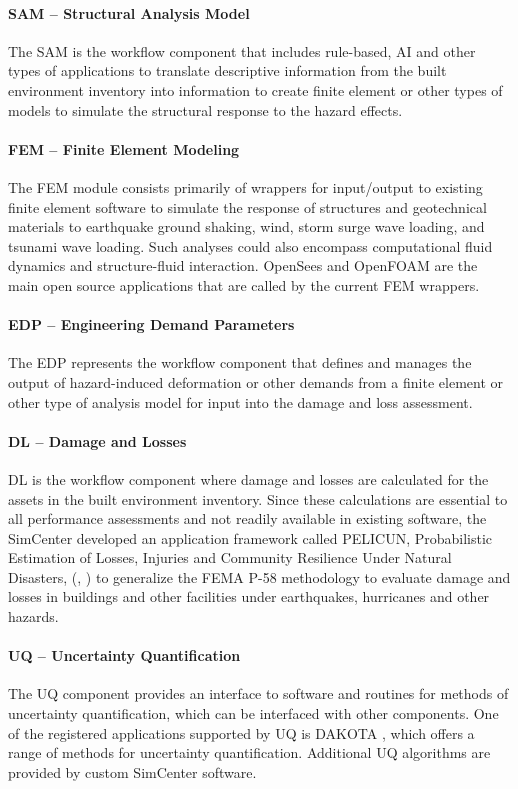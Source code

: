 \paragraph{SAM – Structural Analysis Model} The SAM is the workflow component that includes rule-based, AI and other types of applications to translate descriptive information from the built environment inventory into information to create finite element or other types of models to simulate the structural response to the hazard effects. 

\paragraph{FEM – Finite Element Modeling} The FEM module consists primarily of wrappers for input/output to  existing finite element software to simulate the response of structures and geotechnical materials to earthquake ground shaking, wind, storm surge wave loading, and tsunami wave loading.  Such analyses could also encompass computational fluid dynamics and structure-fluid interaction.  OpenSees  and OpenFOAM  are the main open source applications that are called by the current FEM wrappers.

\paragraph{EDP – Engineering Demand Parameters} The EDP represents the workflow component that defines and manages the output of hazard-induced deformation or other demands from a finite element or other type of analysis model for input into the damage and loss assessment.

\paragraph{DL – Damage and Losses}  DL is the workflow component where damage and losses are calculated for the assets in the built environment inventory. Since these calculations are essential to all performance assessments and not readily available in existing software, the SimCenter developed an application framework called PELICUN, Probabilistic Estimation of Losses, Injuries and Community Resilience Under Natural Disasters, (\cite{zsarnoczay2020pelicun}, ) to generalize the FEMA P-58 methodology to evaluate damage and losses in buildings and other facilities under earthquakes, hurricanes and other hazards. 

\paragraph{UQ – Uncertainty Quantification} The UQ component provides an interface to software and routines for methods of uncertainty quantification, which can be interfaced with other components.  One of the registered applications supported by UQ is DAKOTA \citep{adams2009dakota}, which offers a range of methods for uncertainty quantification. Additional UQ algorithms are provided by custom SimCenter software.


